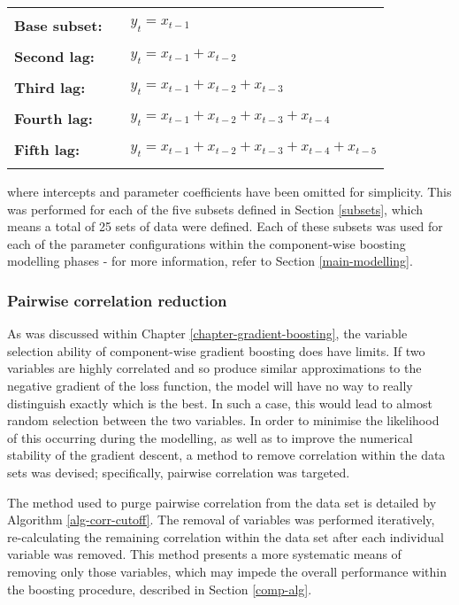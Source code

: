 \documentclass{article}
\begin{document}
\begin{center}
\begin{tabular}{lll}
 &  & \\
\textbf{Base subset:} &  & $y_t = x_{t-1}$\\
 &  & \\
\textbf{Second lag:} &  & $y_t = x_{t-1} + x_{t-2}$\\
 &  & \\
\textbf{Third lag:} &  & $y_t = x_{t-1} + x_{t-2} +x_{t-3}$\\
 &  & \\
\textbf{Fourth lag:} &  & $y_t = x_{t-1} + x_{t-2} +x_{t-3} +x_{t-4}$\\
 &  & \\
\textbf{Fifth lag:} &  & $y_t = x_{t-1} + x_{t-2} +x_{t-3} +x_{t-4} +x_{t-5}$\\
 &  & \\
\end{tabular}
\end{center}


where intercepts and parameter coefficients have been omitted for simplicity. This was performed for each of the five subsets defined in Section \ref{subsets}, which means a total of 25 sets of data were defined. Each of these subsets was used for each of the parameter configurations within the component-wise boosting modelling phases - for more information, refer to Section \ref{main-modelling}.


\subsubsection{Pairwise correlation reduction \label{pairwise-corr}}
\label{sec-6-2-5}

As was discussed within Chapter \ref{chapter-gradient-boosting}, the variable selection ability of component-wise gradient boosting does have limits. If two variables are highly correlated and so produce similar approximations to the negative gradient of the loss function, the model will have no way to really distinguish exactly which is the best. In such a case, this would lead to almost random selection between the two variables. In order to minimise the likelihood of this occurring during the modelling, as well as to improve the numerical stability of the gradient descent, a method to remove correlation within the data sets was devised; specifically, pairwise correlation was targeted. 

The method used to purge pairwise correlation from the data set is detailed by Algorithm \eqref{alg-corr-cutoff}. The removal of variables was performed iteratively, re-calculating the remaining correlation within the data set after each individual variable was removed. This method presents a more systematic means of removing only those variables, which may impede the overall performance within the boosting procedure, described in Section \ref{comp-alg}.
\end{document}
